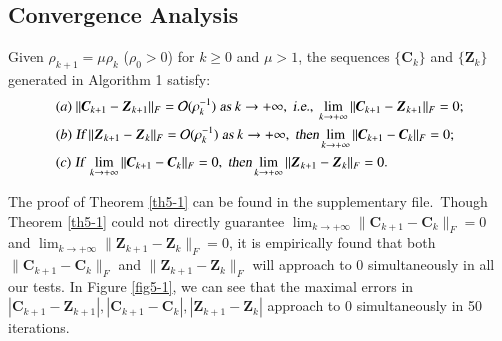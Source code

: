 \subsection{Convergence Analysis}


\begin{theorem}
\label{th5-1}
Given $\rho_{k+1}=\mu\rho_{k}$ ($\rho_{0}>0$) for $k\ge0$ and $\mu>1$, the sequences $\{\bm{C}_{k}\}$ and $\{\bm{Z}_{k}\}$ generated in Algorithm 1 satisfy:
\begin{align}
&
(a)\ 
\|\bm{C}_{k+1}-\bm{Z}_{k+1}\|_{F}=\mathcal{O}(\rho_{k}^{-1})
\ 
\textsl{as}\ k \to +\infty
,\ 
\textsl{i.e.},\ 
\lim_{k \to +\infty} \|\bm{C}_{k+1}-\bm{Z}_{k+1}\|_{F}=0;
\\
&
(b)\ 
\textsl{If}\ 
\|\bm{Z}_{k+1}-\bm{Z}_{k}\|_{F}=\mathcal{O}(\rho_{k}^{-1})
\ 
\textsl{as}\ k \to +\infty
,\ 
\textsl{then} 
\lim_{k \to +\infty} \|\bm{C}_{k+1}-\bm{C}_{k}\|_{F}=0;
\\
&
(c)\ 
\textsl{If}\ 
\lim_{k \to +\infty} \|\bm{C}_{k+1}-\bm{C}_{k}\|_{F}=0
,\ 
\textsl{then} 
\lim_{k \to +\infty} \|\bm{Z}_{k+1}-\bm{Z}_{k}\|_{F}=0.
\end{align}
\end{theorem}
The proof of Theorem \ref{th5-1} can be found in the supplementary file.\ Though Theorem \ref{th5-1} could not directly guarantee $\lim_{k \to +\infty}\|\bm{C}_{k+1}-\bm{C}_{k}\|_{F}=0$ and $\lim_{k \to +\infty}\|\bm{Z}_{k+1}-\bm{Z}_{k}\|_{F}=0$, it is empirically found that both $\|\bm{C}_{k+1}-\bm{C}_{k}\|_{F}$ and $\|\bm{Z}_{k+1}-\bm{Z}_{k}\|_{F}$ will approach to $0$ simultaneously in all our tests. In Figure \ref{fig5-1}, we can see that the maximal errors in $|\bm{C}_{k+1}-\bm{Z}_{k+1}|,|\bm{C}_{k+1}-\bm{C}_{k}|,|\bm{Z}_{k+1}-\bm{Z}_{k}|$ approach to $0$ simultaneously in 50 iterations.


